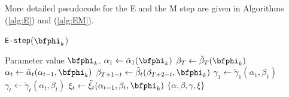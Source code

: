 %
%
More detailed pseudocode for the E and the M step are given in Algorithms (\ref{alg:E}) and (\ref{alg:EM}).
%
\begin{algorithm}
\caption{\texttt{E-step}($\bfphi_k$)}\label{alg:E}
\begin{algorithmic}[1]
\Require Parameter value $\bfphi_k$.
%
\State $\alpha_1 \gets \tilde \alpha_1(\bfphi_k)$
\State $\beta_T \gets \tilde \beta_T(\bfphi_k)$
    \State $\alpha_t \gets \tilde \alpha_t(\alpha_{t-1},\bfphi_k)$
    \State $\beta_{T+1-t} \gets \tilde \beta_t(\beta_{T+2-t},\bfphi_k)$
\EndFor
%
\State $\gamma_1 \gets \tilde \gamma_1(\alpha_{1},\beta_{1})$
    \State $\gamma_t \gets \tilde \gamma_t(\alpha_{t},\beta_{t})$
    \State $\xi_t \gets \tilde \xi_t(\alpha_{t-1},\beta_{t},\bfphi_{k})$
\EndFor
%
\State \Return $\{\alpha,\beta,\gamma,\xi\}$
\end{algorithmic}
\end{algorithm}

